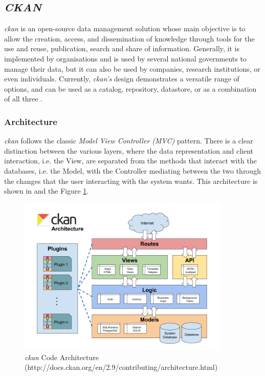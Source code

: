 \subsection{\textit{CKAN}}
  
\textit{\gls{ckan}} is an open-source data management solution whose main objective is to allow the creation, access, and dissemination of knowledge through tools for the use and reuse, publication, search and share of information. Generally, it is implemented by organisations and is used by several national governments to manage their data, but it can also be used by companies, research institutions, or even individuals. Currently, \textit{\gls{ckan}'s} design demonstrates a versatile range of options, and can be used as a catalog, repository, datastore, or as a combination of all three \citep{5}.
  
\subsubsection{Architecture}
  
\textit{\gls{ckan}} follows the classic \textit{Model View Controller (MVC)} pattern. There is a clear distinction between the various layers, where the data representation and client interaction, i.e. the View, are separated from the methods that interact with the databases, i.e. the Model, with the Controller mediating between the two through the changes that the user interacting with the system wants. This architecture is shown in and the Figure \ref{fig:ckan_arch}.
  
\begin{figure}[h!]
    \centering
    \includegraphics[width=0.9\textwidth]{img/state_of_the_art/architecture_ckan.png}
    \caption{\textit{\gls{ckan}} Code Architecture (http://docs.ckan.org/en/2.9/contributing/architecture.html)}
    \label{fig:ckan_arch}
\end{figure}
    
